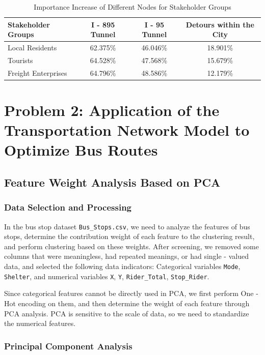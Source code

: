 \documentclass{mcmthesis}
\begin{document}
\begin{table}[H]
  \centering
  \caption{Importance Increase of Different Nodes for Stakeholder Groups}
  \begin{tabular}{lccc}
      \toprule
      Stakeholder Groups & I - 895 Tunnel & I - 95 Tunnel & Detours within the City \\
      \midrule
      Local Residents & 62.375\% & 46.046\% & 18.901\% \\
      Tourists & 64.528\% & 47.568\% & 15.679\% \\
      Freight Enterprises & 64.796\% & 48.586\% & 12.179\% \\
      \bottomrule
  \end{tabular}
\end{table}

\section{Problem 2: Application of the Transportation Network Model to Optimize Bus Routes}

\subsection{Feature Weight Analysis Based on PCA}

\subsubsection{Data Selection and Processing}

In the bus stop dataset \texttt{Bus\_Stops.csv}, we need to analyze the features of bus stops, determine the contribution weight of each feature to the clustering result, and perform clustering based on these weights. After screening, we removed some columns that were meaningless, had repeated meanings, or had single - valued data, and selected the following data indicators:
Categorical variables \texttt{Mode}, \texttt{Shelter}, and numerical variables \texttt{X}, \texttt{Y}, \texttt{Rider\_Total}, \texttt{Stop\_Rider}.

Since categorical features cannot be directly used in PCA\cite{Hotelling1933}, we first perform One - Hot encoding on them, and then determine the weight of each feature through PCA analysis. PCA is sensitive to the scale of data, so we need to standardize the numerical features.

\subsubsection{Principal Component Analysis}
\end{document}
